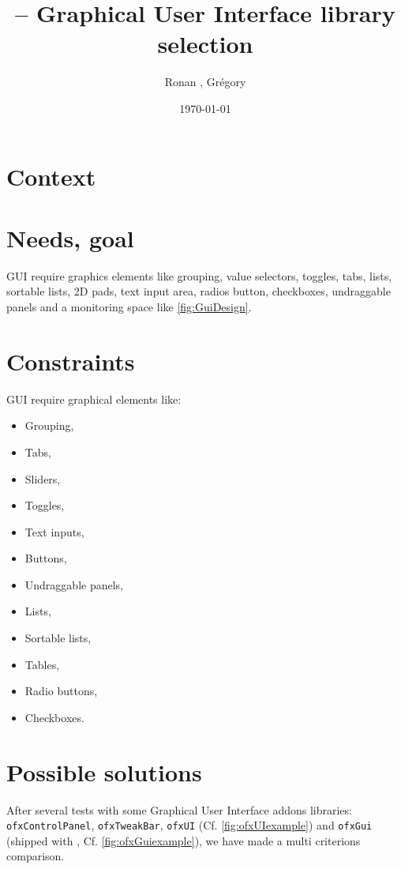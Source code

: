 \documentclass[a4paper,titlepage,oneside]{article}
\author{Ronan \bsc{Legardinier}, Grégory \bsc{David}}
\title{\vilain{} -- Graphical User Interface library selection}
\date{\today{}}
\begin{document}
\maketitle{}
\tableofcontents{}
\newpage

\section{Context}


\section{Needs, goal}
\vilain{} GUI require graphics elements like grouping, value selectors, toggles, tabs, lists, sortable lists, 2D pads, text input area, radios button, checkboxes, undraggable panels and a monitoring space like \figurename
\ref{fig:GuiDesign}.


\newpage
\section{Constraints}
\vilain{} GUI require graphical elements like:
\begin{itemize}
    \item Grouping,
    \item Tabs,
    \item Sliders,
    \item Toggles,
    \item Text inputs,
    \item Buttons,
    \item Undraggable panels,
    \item Lists,
    \item Sortable lists,
    \item Tables,
    \item Radio buttons,
    \item Checkboxes.
\end{itemize}

\newpage
\section{Possible solutions}
After several tests with some \OF{} Graphical User Interface addons libraries: \texttt{ofxControlPanel}, \texttt{ofxTweakBar}, \texttt{ofxUI} (Cf. \figurename \ref{fig:ofxUIexample}) and \texttt{ofxGui} (shipped with \OF{}, Cf. \figurename \ref{fig:ofxGuiexample}), we have made a multi criterions comparison.
\end{document}
